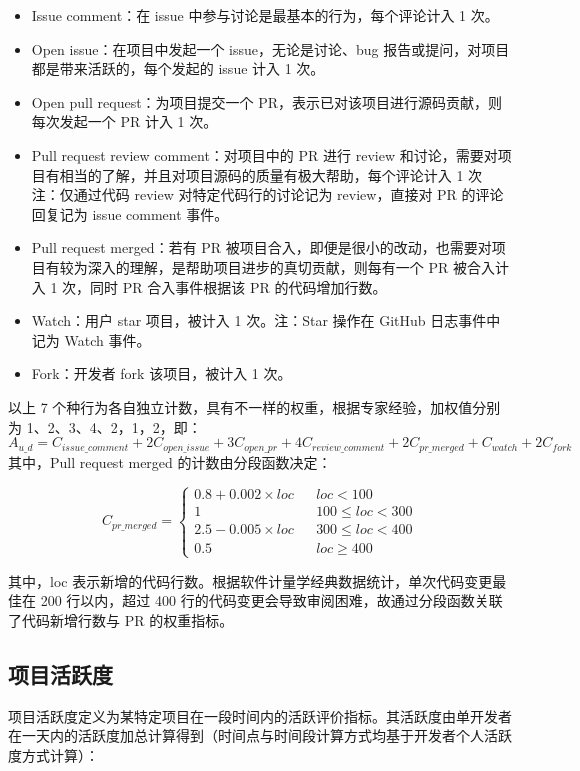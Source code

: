 \begin{itemize}
    \item Issue comment：在 issue 中参与讨论是最基本的行为，每个评论计入 1 次。
    \item Open issue：在项目中发起一个 issue，无论是讨论、bug 报告或提问，对项目都是带来活跃的，每个发起的 issue 计入 1 次。
    \item Open pull request：为项目提交一个 PR，表示已对该项目进行源码贡献，则每次发起一个 PR 计入 1 次。
    \item Pull request review comment：对项目中的 PR 进行 review 和讨论，需要对项目有相当的了解，并且对项目源码的质量有极大帮助，每个评论计入 1 次\\
          注：仅通过代码 review 对特定代码行的讨论记为 review，直接对 PR 的评论回复记为 issue comment 事件。
    \item Pull request merged：若有 PR 被项目合入，即便是很小的改动，也需要对项目有较为深入的理解，是帮助项目进步的真切贡献，则每有一个 PR 被合入计入 1 次，同时 PR 合入事件根据该 PR 的代码增加行数。
    \item Watch：用户 star 项目，被计入 1 次。注：Star 操作在 GitHub 日志事件中记为 Watch 事件。
    \item Fork：开发者 fork 该项目，被计入 1 次。
\end{itemize}

以上 7 个种行为各自独立计数，具有不一样的权重，根据专家经验，加权值分别为 1、2、3、4、2，1，2，即：
$$
 A_{u\_d}=C_{issue\_comment}+2{C}_{open\_issue}+3{C}_{open\_pr}+4{C}_{review\_comment}+2{C}_{pr\_merged}+{C}_{watch}+2{C}_{fork} 
$$
其中，Pull request merged 的计数由分段函数决定\cite{tsay2014influence}：

$$ C_{pr\_merged}=\left\{
    \begin{array}{rcl}
        0.8+0.002 \times loc &  & {loc < 100}          \\
        1                    &  & {100 \leq loc < 300} \\
        2.5-0.005 \times loc &  & {300 \leq loc < 400} \\
        0.5                  &  & {loc \geq 400}
    \end{array} \right.
$$

其中，loc 表示新增的代码行数。根据软件计量学经典数据统计，单次代码变更最佳在 200 行以内，超过 400 行的代码变更会导致审阅困难，故通过分段函数关联了代码新增行数与 PR 的权重指标。

\subsection{项目活跃度}
\par 项目活跃度定义为某特定项目在一段时间内的活跃评价指标。其活跃度由单开发者在一天内的活跃度加总计算得到（时间点与时间段计算方式均基于开发者个人活跃度方式计算）：

